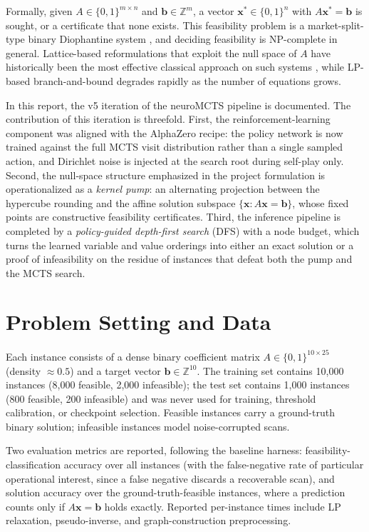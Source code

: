 \documentclass[12pt]{article}
\begin{document}
Formally, given $A \in \{0,1\}^{m \times n}$ and $\mathbf{b} \in \mathbb{Z}^m$, a vector $\mathbf{x}^\ast \in \{0,1\}^n$ with $A\mathbf{x}^\ast = \mathbf{b}$ is sought, or a certificate that none exists. This feasibility problem is a market-split-type binary Diophantine system \citep{cornuejols1998market, aardal2000market}, and deciding feasibility is NP-complete in general. Lattice-based reformulations that exploit the null space of $A$ have historically been the most effective classical approach on such systems \citep{aardal2000market}, while LP-based branch-and-bound degrades rapidly as the number of equations grows.

In this report, the v5 iteration of the neuroMCTS pipeline is documented. The contribution of this iteration is threefold. First, the reinforcement-learning component was aligned with the AlphaZero recipe: the policy network is now trained against the full MCTS visit distribution rather than a single sampled action, and Dirichlet noise is injected at the search root during self-play only. Second, the null-space structure emphasized in the project formulation is operationalized as a \emph{kernel pump}: an alternating projection between the hypercube rounding and the affine solution subspace $\{\mathbf{x} : A\mathbf{x} = \mathbf{b}\}$, whose fixed points are constructive feasibility certificates. Third, the inference pipeline is completed by a \emph{policy-guided depth-first search} (DFS) with a node budget, which turns the learned variable and value orderings into either an exact solution or a proof of infeasibility on the residue of instances that defeat both the pump and the MCTS search.

\section{Problem Setting and Data}

Each instance consists of a dense binary coefficient matrix $A \in \{0,1\}^{10 \times 25}$ (density $\approx 0.5$) and a target vector $\mathbf{b} \in \mathbb{Z}^{10}$. The training set contains 10{,}000 instances (8{,}000 feasible, 2{,}000 infeasible); the test set contains 1{,}000 instances (800 feasible, 200 infeasible) and was never used for training, threshold calibration, or checkpoint selection. Feasible instances carry a ground-truth binary solution; infeasible instances model noise-corrupted scans.

Two evaluation metrics are reported, following the baseline harness: feasibility-classification accuracy over all instances (with the false-negative rate of particular operational interest, since a false negative discards a recoverable scan), and solution accuracy over the ground-truth-feasible instances, where a prediction counts only if $A\mathbf{x} = \mathbf{b}$ holds exactly. Reported per-instance times include LP relaxation, pseudo-inverse, and graph-construction preprocessing.
\end{document}
